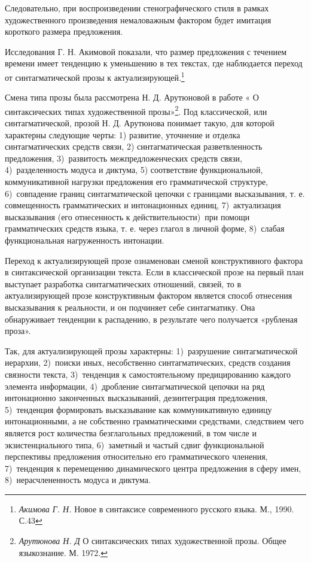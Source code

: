 \documentclass{kursa4}
\begin{document}
{      Следовательно, при воспроизведении стенографического стиля в рамках
      художественного произведения немаловажным фактором будет имитация
      короткого размера предложения. 

      Исследования Г. Н. Акимовой показали, что размер предложения с
      течением времени имеет тенденцию к уменьшению в тех текстах, где
      наблюдается переход от синтагматической прозы к
      актуализирующей.\footnote{{
      }\textit{{Акимова Г. Н.}}{ Новое в
      синтаксисе современного русского языка. М., 1990. С.43}} 

      Смена типа прозы была рассмотрена Н. Д. Арутюновой в работе « О
      синтаксических типах художественной прозы»\footnote{{
      }\textit{{Арутюнова Н. Д}}{ О
      синтаксических типах художественной прозы. Общее языкознание. М.
      1972.}}. Под классической, или синтагматической, прозой Н. Д. Арутюнова
      понимает такую, для которой характерны следующие черты:
      1) развитие, уточнение и отделка синтагматических средств связи, 2)
      синтагматическая разветвленность предложения, 3)~развитость
      межпредложенческих средств связи, 4)~разделенность модуса и диктума, 5)
      соответствие функциональной, коммуникативной нагрузки предложения его
      грамматической структуре, 6)~совпадение границ синтагматической цепочки
      с границами высказывания, т. е. совмещенность грамматических и
      интонационных единиц, 7)~актуализация высказывания (его отнесенность к
      действительности)~при помощи грамматических средств языка, т. е. через
      глагол в личной форме, 8)~слабая функциональная нагруженность
      интонации.

      Переход к актуализирующей прозе ознаменован сменой конструктивного
      фактора в синтаксической организации текста. Если в классической прозе
      на первый план выступает разработка синтагматических отношений, связей,
      то в актуализирующей прозе конструктивным фактором является способ
      отнесения высказывания к реальности, и он подчиняет себе синтагматику.
      Она обнаруживает тенденции к распадению, в результате чего получается
      «рубленая проза». 

      Так, для актуализирующей прозы характерны:
      1)~разрушение синтагматической иерархии, 2)~поиски иных, несобственно
      синтагматических, средств создания связности текста, 3)~тенденция к
      самостоятельному предицированию каждого элемента информации, 4)~дробление синтагматической цепочки на ряд интонационно законченных
      высказываний, дезинтеграция предложения, 5)~тенденция формировать
      высказывание как коммуникативную единицу интонационными, а не
      собственно грамматическими средствами, следствием чего является рост
      количества безглагольных предложений, в том числе и экзистенциального
      типа, 6)~заметный и частый сдвиг функциональной перспективы предложения
      относительно его грамматического членения, 7)~тенденция к перемещению
      динамического центра предложения в сферу имен, 8)~нерасчлененность
      модуса и диктума.

}
\end{document}
